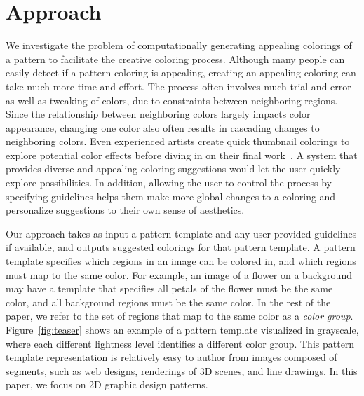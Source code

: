 \section{Approach}
\label{sec:approach}


We investigate the problem of computationally generating appealing colorings of a pattern to facilitate the creative coloring process. Although many people can easily detect if a pattern coloring is appealing, creating an appealing coloring can take much more time and effort. The process often involves much trial-and-error as well as tweaking of colors, due to constraints between neighboring regions. Since the relationship between neighboring colors largely impacts color appearance, changing one color also often results in cascading changes to neighboring colors. Even experienced artists create quick thumbnail colorings to explore potential color effects before diving in on their final work~\cite{ColorPaletteTools}. A system that provides diverse and appealing coloring suggestions would let the user quickly explore possibilities. In addition, allowing the user to control the process by specifying guidelines helps them make more global changes to a coloring and personalize suggestions to their own sense of aesthetics.


Our approach takes as input a pattern template and any user-provided guidelines if available, and outputs suggested colorings for that pattern template. A pattern template specifies which regions in an image can be colored in, and which regions must map to the same color. For example, an image of a flower on a background may have a template that specifies all petals of the flower must be the same color, and all background regions must be the same color. In the rest of the paper, we refer to the set of regions that map to the same color as a \emph{color group}. Figure~\ref{fig:teaser} shows an example of a pattern template visualized in grayscale, where each different lightness level identifies a different color group. This pattern template representation is relatively easy to author from images composed of segments, such as web designs, renderings of 3D scenes, and line drawings. In this paper, we focus on 2D graphic design patterns. 

